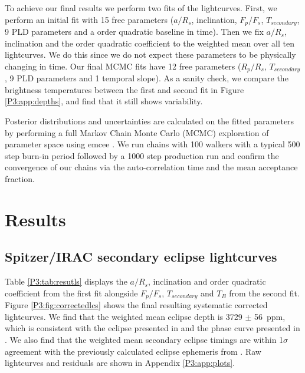 To achieve our final results we perform two fits of the lightcurves. First, we perform an initial fit with 15 free parameters ($a/R_s$, inclination, $F_p/F_s$, $T_{secondary}$, 9 PLD parameters and a  order quadratic baseline in time). Then we fix $a/R_s$, inclination and the  order quadratic coefficient to the weighted mean over all ten lightcurves. We do this since we do not expect these parameters to be physically changing in time. Our final MCMC fits have 12 free parameters ($R_p/R_s$, $T_{secondary}$, 9 PLD parameters and 1 temporal slope). As a sanity check, we compare the brightness temperatures between the first and second fit in Figure \ref{P3:app:depths}, and find that it still shows variability.

Posterior distributions and uncertainties are calculated on the fitted parameters by performing a full Markov Chain Monte Carlo (MCMC) exploration of parameter space using emcee \citep{Foreman-Mackey2013}. We run chains with 100 walkers with a typical 500 step burn-in period followed by a 1000 step production run and confirm the convergence of our chains via the auto-correlation time and the mean acceptance fraction.

\section{Results}
\subsection{Spitzer/IRAC secondary eclipse lightcurves}
\label{P3:sec:lcresults}

Table \ref{P3:tab:resutls} displays the $a/R_s$, inclination and  order quadratic coefficient from the first fit alongside
$F_p/F_s$, $T_{secondary}$ and $T_B$ from the second fit. Figure \ref{P3:fig:correctedlcs} shows the final resulting systematic corrected lightcurves. We find that the weighted mean eclipse depth is 3729 $\pm$ 56~ppm, which is consistent with the eclipse presented in \citet{Nymeyer2011} and the phase curve presented in \citet{Maxted2013}. We also find that the weighted mean secondary eclipse timings are within 1$\sigma$ agreement with the previously calculated eclipse ephemeris from \citet{Maxted2013}. Raw lightcurves and residuals are shown in Appendix \ref{P3:app:plots}.

